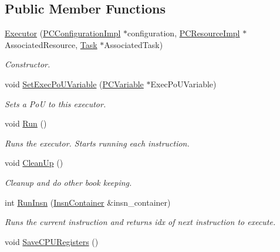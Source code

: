 \subsection*{Public Member Functions}
\begin{DoxyCompactItemize}
\item 
\hyperlink{classpc__emulator_1_1Executor_a55e78f5999c4ba3648a66927426a51d0}{Executor} (\hyperlink{classpc__emulator_1_1PCConfigurationImpl}{P\+C\+Configuration\+Impl} $\ast$configuration, \hyperlink{classpc__emulator_1_1PCResourceImpl}{P\+C\+Resource\+Impl} $\ast$Associated\+Resource, \hyperlink{classpc__emulator_1_1Task}{Task} $\ast$Associated\+Task)
\begin{DoxyCompactList}\small\item\em Constructor. \end{DoxyCompactList}\item 
void \hyperlink{classpc__emulator_1_1Executor_a2dbf56b19f3fbaf775f7b33b50ec8de9}{Set\+Exec\+Po\+U\+Variable} (\hyperlink{classpc__emulator_1_1PCVariable}{P\+C\+Variable} $\ast$Exec\+Po\+U\+Variable)
\begin{DoxyCompactList}\small\item\em Sets a PoU to this executor. \end{DoxyCompactList}\item 
void \hyperlink{classpc__emulator_1_1Executor_a2fd64c8278fe4cb4b3040c1f1cc0c874}{Run} ()\hypertarget{classpc__emulator_1_1Executor_a2fd64c8278fe4cb4b3040c1f1cc0c874}{}\label{classpc__emulator_1_1Executor_a2fd64c8278fe4cb4b3040c1f1cc0c874}

\begin{DoxyCompactList}\small\item\em Runs the executor. Starts running each instruction. \end{DoxyCompactList}\item 
void \hyperlink{classpc__emulator_1_1Executor_a8bbf346063821d7a9c5e9b734f29a70f}{Clean\+Up} ()\hypertarget{classpc__emulator_1_1Executor_a8bbf346063821d7a9c5e9b734f29a70f}{}\label{classpc__emulator_1_1Executor_a8bbf346063821d7a9c5e9b734f29a70f}

\begin{DoxyCompactList}\small\item\em Cleanup and do other book keeping. \end{DoxyCompactList}\item 
int \hyperlink{classpc__emulator_1_1Executor_abf2af6604c54863a1a67a36a2526e357}{Run\+Insn} (\hyperlink{classpc__emulator_1_1InsnContainer}{Insn\+Container} \&insn\+\_\+container)
\begin{DoxyCompactList}\small\item\em Runs the current instruction and returns idx of next instruction to execute. \end{DoxyCompactList}\item 
void \hyperlink{classpc__emulator_1_1Executor_ad1bfe0eefa104d73193b062270e83008}{Save\+C\+P\+U\+Registers} ()\hypertarget{classpc__emulator_1_1Executor_ad1bfe0eefa104d73193b062270e83008}{}\label{classpc__emulator_1_1Executor_ad1bfe0eefa104d73193b062270e83008}


\end{DoxyCompactItemize}
